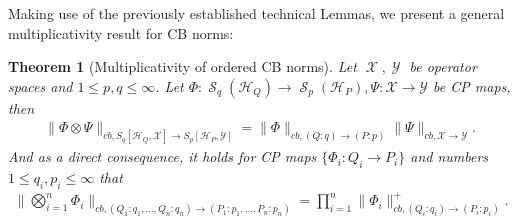 \documentclass[11pt]{article}
\newcommand{\1}{\ensuremath{\mathbbm{1}}}
\theoremstyle{newdefinition}
\theoremstyle{newplain}
\newtheorem{theorem}[definition]{Theorem}
\theoremstyle{myplain}
\DeclareMathOperator{\cS}{\mathcal{S}}
\DeclareMathOperator{\cX}{\mathcal{X}}
\DeclareMathOperator{\cY}{\mathcal{Y}}
\begin{document}
Making use of the previously established technical Lemmas, we present a general multiplicativity result for CB norms:
\begin{theorem}[Multiplicativity of ordered CB norms]\label{thm:general.multiplicativity}
Let $\cX, \cY$ be operator spaces and $1 \leq p,q \leq \infty$. Let $\Phi:\cS_q(\mathcal{H}_Q)\to \cS_p(\mathcal{H}_P),\Psi:\mathcal{X}\to \mathcal{Y}$ be CP maps, then
\begin{align}
\|\Phi\otimes\Psi\|_{cb,S_q[\mathcal{H}_Q,\mathcal{X}]\to S_p[\mathcal{H}_P,\mathcal{Y}]} = \|\Phi\|_{cb,(Q:q)\to (P:p)}\|\Psi\|_{cb,\mathcal{X}\to \mathcal{Y}}.
\end{align} And as a direct consequence, it holds for CP maps $\{\Phi_i:Q_i\to P_i\}$ and numbers $1\leq q_i,p_i\leq\infty$ that
\begin{align}
    \|\bigotimes_{i=1}^n\Phi_i\|_{cb,(Q_1:q_1,...,Q_n:q_n)\to (P_1:p_1,...,P_n:p_n)} = \prod_{i=1}^n\|\Phi_i\|^+_{cb,(Q_i:q_i)\to (P_i:p_i)}.
\end{align}
\end{theorem}
\end{document}
